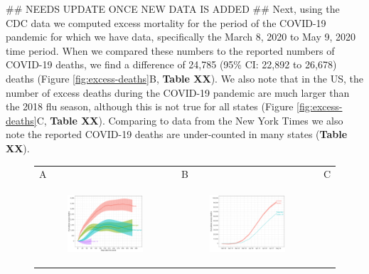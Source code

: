 \documentclass[11pt]{article}
\begin{document}
## NEEDS UPDATE ONCE NEW DATA IS ADDED ##
Next, using the CDC data we computed excess mortality for the period of the COVID-19 pandemic for which we have data, specifically the March 8, 2020 to May 9, 2020 time period. When we compared these numbers to the reported numbers of COVID-19 deaths, we find a difference of 24,785 (95\% CI: 22,892 to 26,678) deaths (Figure \ref{fig:excess-deaths}B, \textbf{Table XX}). We also note that in the US, the number of excess deaths during the COVID-19 pandemic are much larger than the 2018 flu season, although this is not true for all states (Figure \ref{fig:excess-deaths}C, \textbf{Table XX}). Comparing to data from the New York Times \cite{smith2020coronavirus} we also note the reported COVID-19 deaths are under-counted in many states (\textbf{Table XX}).

\begin{figure}[ht]
	\begin{tabular}{lll}
	A&B&C\\
	\begin{subfigure}[t]{0.3\linewidth}
		\centering
		\includegraphics[width=1\linewidth]{figs/figure-2a.pdf} 
	\end{subfigure}&
	\begin{subfigure}[t]{0.3\linewidth}
		\centering
		\includegraphics[width=1\linewidth]{figs/figure-2b.pdf}

\end{subfigure}
\end{tabular}
\end{figure}
\end{document}
